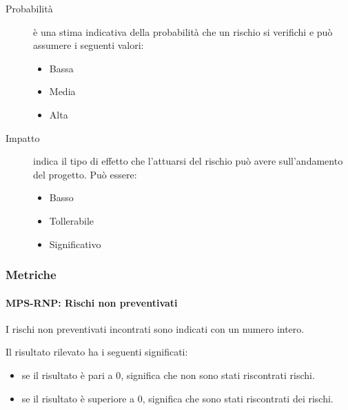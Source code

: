 \documentclass[../../norme-di-progetto.tex]{subfiles}
\begin{document}
\begin{description}
  \item[Probabilità] è una stima indicativa della probabilità che un rischio si verifichi e può assumere i seguenti valori:
        \begin{itemize}
          \item Bassa
          \item Media
          \item Alta
        \end{itemize}
  \item[Impatto] indica il tipo di effetto che l'attuarsi del rischio può avere sull'andamento del progetto. Può essere:
        \begin{itemize}
          \item Basso
          \item Tollerabile
          \item Significativo
        \end{itemize}
\end{description}


\subsubsection{Metriche}%
\label{subs:gestione_dei_rischi/metriche}


\paragraph{MPS-RNP: Rischi non preventivati}%
\label{par:MPS-COC_rischi_non_preventivati}

I rischi non preventivati incontrati sono indicati con un numero intero.

Il risultato rilevato ha i seguenti significati:
\begin{itemize}
  \item se il risultato è pari a 0, significa che non sono stati riscontrati rischi.
  \item se il risultato è superiore a 0, significa che sono stati riscontrati dei rischi.
\end{itemize}





\end{document}
